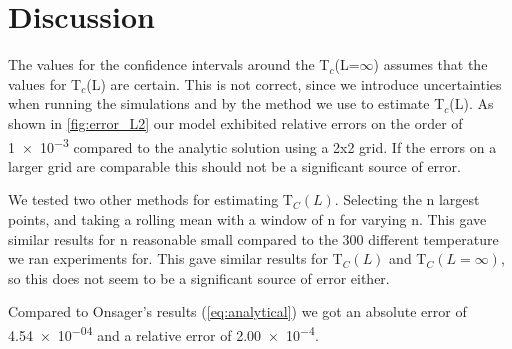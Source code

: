 \section{Discussion}

The values for the confidence intervals around the T$_c$(L=$\infty$) assumes
that the values for T$_c$(L) are certain. This is not correct, since we
introduce uncertainties when running the simulations and by the method we use to
estimate T$_c$(L). As shown in \cref{fig:error_L2} our model exhibited relative
errors on the order of \num{1e-3} compared to the analytic solution using a 2x2
grid. If the errors on a larger grid are comparable this should not be a
significant source of error.

We tested two other methods for estimating T$_C(L)$. Selecting the n largest
points, and taking a rolling mean with a window of n for varying n. This gave
similar results for n reasonable small compared to the 300 different temperature
we ran experiments for. This gave similar results for T$_C(L)$ and
T$_C(L=\infty)$, so this does not seem to be a significant source of error
either.

Compared to Onsager's results (\cref{eq:analytical}) we got an absolute error
of \num{4.54e-04} and a relative error of \num{2.00e-4}.
